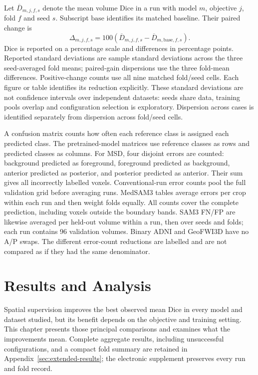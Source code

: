 \documentclass[12pt,a4paper]{article}
\begin{document}
Let $\overline D_{m,j,f,s}$ denote the mean volume Dice in a run with
model $m$, objective $j$, fold $f$ and seed $s$. Subscript
$\mathrm{base}$ identifies its matched baseline. Their paired change is
\begin{equation}
 \Delta_{m,j,f,s}=100\left(
 \overline D_{m,j,f,s}-\overline D_{m,\mathrm{base},f,s}\right).
\label{eq:paired-reported-gain}
\end{equation}
Dice is reported on a percentage scale and differences in percentage
points. Reported standard deviations are sample standard deviations across
the three seed-averaged fold means; paired-gain dispersions use the three
fold-mean differences. Positive-change counts use all nine matched
fold/seed cells. Each figure or table identifies its reduction explicitly.
These standard deviations are not confidence intervals over independent datasets: seeds share data,
training pools overlap and configuration selection is exploratory.
Dispersion across cases is identified separately from dispersion
across fold/seed cells.

A confusion matrix counts how often each reference class is assigned each
predicted class. The pretrained-model matrices use reference classes as rows
and predicted classes as columns. For MSD, four disjoint errors are counted:
background predicted as foreground, foreground predicted as background,
anterior predicted as posterior, and posterior predicted as anterior. Their
sum gives all incorrectly labelled voxels. Conventional-run error counts
pool the full validation grid before averaging runs. MedSAM3 tables average
errors per crop within each run and then weight folds equally. All counts
cover the complete prediction, including voxels outside the boundary bands.
SAM3 FN/FP are likewise averaged per held-out volume within a run, then over
seeds and folds; each run contains 96 validation volumes. Binary ADNI and
GeoFWI3D have no A/P swaps. The different error-count reductions are
labelled and are not compared as if they had the same denominator.

\clearpage

\section{Results and Analysis}
\label{sec:results}

Spatial supervision improves the best observed mean Dice in every model
and dataset studied, but its benefit depends on the objective and training
setting. This chapter presents those principal comparisons and examines
what the improvements mean. Complete aggregate results, including unsuccessful configurations,
and a compact fold summary are retained in Appendix~\ref{sec:extended-results};
the electronic supplement preserves every run and fold record.
\end{document}
